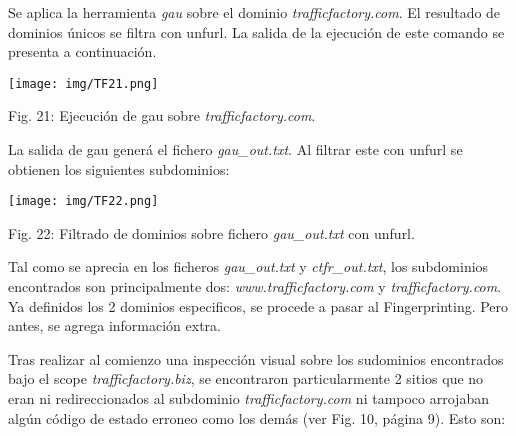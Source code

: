 \documentclass[12pt,oneside,a4paper]{book}
\begin{document}
\hspace{20pt}
Se aplica la herramienta \textit{gau} sobre el dominio \textit{trafficfactory.com}. El resultado de dominios únicos se filtra con unfurl. La salida de la ejecución de este comando se presenta a continuación.

\vspace{2em}

\begin{center}
	\texttt{[image: img/TF21.png]}
    
\vspace{0.1em}
    
    Fig. 21: Ejecución de gau sobre \textit{trafficfactory.com}.
\end{center}

\vspace{2em}

\hspace{20pt}
La salida de gau generá el fichero \textit{gau\_out.txt}. Al filtrar este con unfurl se obtienen los siguientes subdominios:

\vspace{2em}

\begin{center}
	\texttt{[image: img/TF22.png]}
    
\vspace{0.1em}
    
    Fig. 22: Filtrado de dominios sobre fichero \textit{gau\_out.txt} con unfurl.
\end{center}

\vspace{2em}

\hspace{20pt}
Tal como se aprecia en los ficheros \textit{gau\_out.txt} y \textit{ctfr\_out.txt}, los subdominios encontrados son principalmente dos: \textit{www.trafficfactory.com} y \textit{trafficfactory.com}. Ya definidos los 2 dominios especificos, se procede a pasar al Fingerprinting. Pero antes, se agrega información extra. 

\vspace{1em}

\hspace{20pt}
Tras realizar al comienzo una inspección visual sobre los sudominios encontrados bajo el scope \textit{trafficfactory.biz}, se encontraron particularmente 2 sitios que no eran ni redireccionados al subdominio \textit{trafficfactory.com} ni tampoco arrojaban algún código de estado erroneo como los demás (ver Fig. 10, página 9). Esto son:
\end{document}
